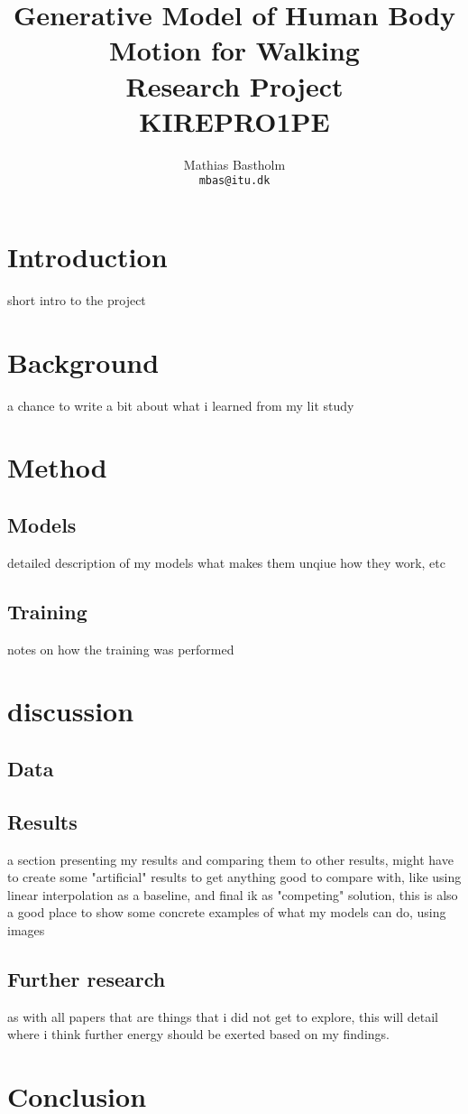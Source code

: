 \documentclass{article}
\title{%
    Generative Model of Human Body Motion for Walking\\
    \large Research Project\\
    \small KIREPRO1PE
}
\author{%
    Mathias Bastholm\\
    \texttt{mbas@itu.dk}
}
\begin{document}
\maketitle

\section{Introduction}\label{sec:introduction}
short intro to the project

\section{Background}\label{sec:background}
a chance to write a bit about what i learned from my lit study

\section{Method}\label{sec:method}
\subsection{Models}\label{subsec:models}
detailed description of my models what makes them unqiue how they work, etc
\subsection{Training}\label{subsec:training}
notes on how the training was performed

\section{discussion}\label{sec:discussion}
\subsection{Data}\label{subsec:data}
\subsection{Results}\label{subsec:results}
a section presenting my results and comparing them to other results, might have to create some "artificial" results
to get anything good to compare with, like using linear interpolation as a baseline, and final ik as "competing"
solution, this is also a good place to show some concrete examples of what my models can do, using images

\subsection{Further research}\label{subsec:further-research}
as with all papers that are things that i did not get to explore, this will detail where i think further energy should
be exerted based on my findings.

\section{Conclusion}\label{sec:conclusion}

\newpage

\printbibliography%
\end{document}
